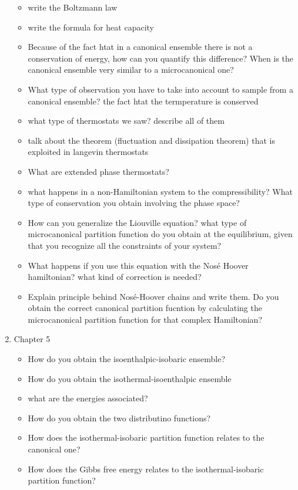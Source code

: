 \begin{enumerate}
\begin{itemize}
        \item write the Boltzmann law
        \item write the formula for heat capacity
        \item Because of the fact htat in a canonical ensemble there is not a conservation of energy, how can you quantify this difference? When is the canonical ensemble very similar to a microcanonical one?
        \item What type of observation you have to take into account to sample from a canonical ensemble? the fact htat the termperature is conserved
        \item what type of thermostats we saw? describe all of them
        \item talk about the theorem (fluctuation and dissipation theorem) that is exploited in langevin thermostats
        \item What are extended phase thermostats?
        \item what happens in a non-Hamiltonian system to the compressibility? What type of conservation you obtain involving the phase space?
        \item How can you generalize the Liouville equation? what type of microcanonical partition function do you obtain at the equilibrium, given that you recognize all the constraints of your system?
        \item What happens if you use this equation with the Nosé Hoover hamiltonian? what kind of correction is needed?
        \item Explain principle behind Nosé-Hoover chains and write them. Do you obtain the correct canonical partition fucntion by calculating the microcanonical partition function for that complex Hamiltonian?
    \end{itemize}
    \item Chapter 5
    \begin{itemize}
        \item How do you obtain the isoenthalpic-isobaric ensemble?
        \item How do you obtain the isothermal-isoenthalpic ensemble
        \item what are the energies associated?
        \item How do you obtain the two distributino functions?
        \item How does the isothermal-isobaric partition function relates to the canonical one?
        \item How does the Gibbs free energy relates to the isothermal-isobaric partition function?

\end{itemize}
\end{enumerate}
